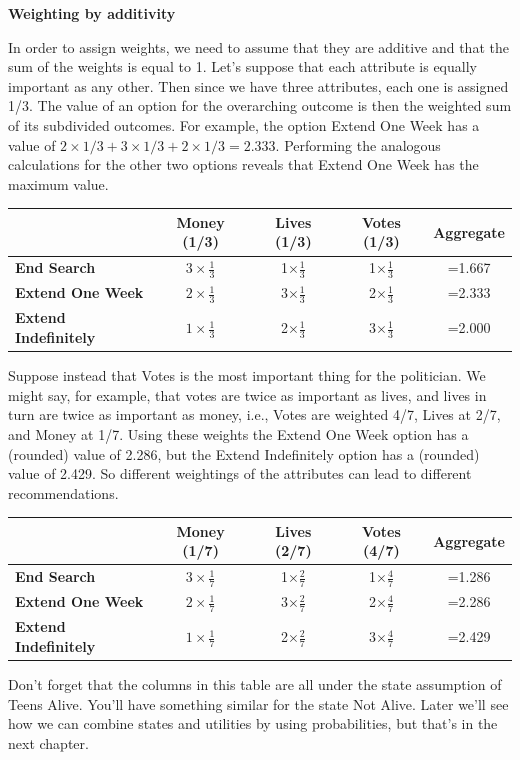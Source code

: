 \documentclass[]{tufte-book}
\begin{document}
\textbf{Weighting by additivity}

In order to assign weights, we need to assume that they are additive and that the sum of the weights is equal to 1. Let's suppose that each attribute is equally important as any other. Then since we have three attributes, each one is assigned 1/3. The value of an option for the overarching outcome is then the weighted sum of its subdivided outcomes. For example, the option Extend One Week has a value of \(2\times 1/3 + 3 \times 1/3 + 2 \times 1/3 = 2.333\). Performing the analogous calculations for the other two options reveals that Extend One Week has the maximum value.

\begin{longtable}[]{@{}lcccc@{}}
\toprule
& Money (1/3) & Lives (1/3) & Votes (1/3) & Aggregate\tabularnewline
\midrule
\endhead
\textbf{End Search} & \(3\times \frac{1}{3}\) & 1\(\times \frac{1}{3}\) & 1\(\times \frac{1}{3}\) & =1.667\tabularnewline
\textbf{Extend One Week} & \(2\times \frac{1}{3}\) & 3\(\times \frac{1}{3}\) & 2\(\times \frac{1}{3}\) & =2.333\tabularnewline
\textbf{Extend Indefinitely} & \(1\times \frac{1}{3}\) & 2\(\times \frac{1}{3}\) & 3\(\times \frac{1}{3}\) & =2.000\tabularnewline
\bottomrule
\end{longtable}

Suppose instead that Votes is the most important thing for the politician. We might say, for example, that votes are twice as important as lives, and lives in turn are twice as important as money, i.e., Votes are weighted 4/7, Lives at 2/7, and Money at 1/7. Using these weights the Extend One Week option has a (rounded) value of 2.286, but the Extend Indefinitely option has a (rounded) value of 2.429. So different weightings of the attributes can lead to different recommendations.

\begin{longtable}[]{@{}lcccc@{}}
\toprule
& Money (1/7) & Lives (2/7) & Votes (4/7) & Aggregate\tabularnewline
\midrule
\endhead
\textbf{End Search} & \(3\times \frac{1}{7}\) & 1\(\times \frac{2}{7}\) & 1\(\times \frac{4}{7}\) & =1.286\tabularnewline
\textbf{Extend One Week} & \(2\times \frac{1}{7}\) & 3\(\times \frac{2}{7}\) & 2\(\times \frac{4}{7}\) & =2.286\tabularnewline
\textbf{Extend Indefinitely} & \(1\times \frac{1}{7}\) & 2\(\times \frac{2}{7}\) & 3\(\times \frac{4}{7}\) & =2.429\tabularnewline
\bottomrule
\end{longtable}

Don't forget that the columns in this table are all under the state assumption of Teens Alive. You'll have something similar for the state Not Alive. Later we'll see how we can combine states and utilities by using probabilities, but that's in the next chapter.
\end{document}
